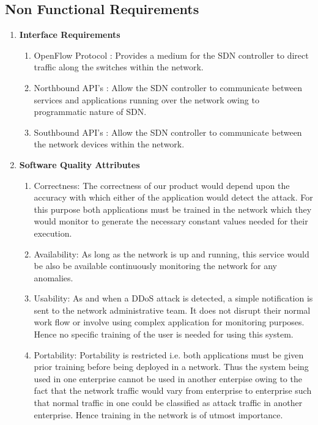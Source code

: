 \documentclass[12pt,a4paper,final]{report}
\begin{document}
\subsection{Non Functional Requirements}
\begin{enumerate}
\item
\textbf{Interface Requirements}
\begin{enumerate}
\item OpenFlow Protocol :
\newline
Provides a medium for the SDN controller to direct traffic along the switches within the network.

\item Northbound API's :
\newline
Allow the SDN controller to communicate between services and applications running over the network owing to programmatic nature of SDN.

\item Southbound API's :
\newline
Allow the SDN controller to communicate between the network devices within the network.
\end{enumerate}

\item
\textbf{Software Quality Attributes}
\begin{enumerate}
\item Correctness:
\newline
The correctness of our product would depend upon the accuracy with which either of the application would detect the attack. For this purpose both applications must be trained in the network which they would monitor to generate the necessary constant values needed for their execution.

\item Availability:
\newline
As long as the network is up and running, this service would be also be available continuously monitoring the network for any anomalies.

\newpage
\item Usability: 
\newline
As and when a DDoS attack is detected, a simple notification is sent to the network administrative team. It does not disrupt their normal work flow or involve using complex application for monitoring purposes. Hence no specific training of the user is needed for using this system. 

\item Portability: 
\newline
Portability is restricted i.e. both applications must be given prior training before being deployed in a network. Thus the system being used in one enterprise cannot be used in another enterpise owing to the fact that the network traffic would vary from enterprise to enterprise such that normal traffic in one could be classified as attack traffic in another enterprise. Hence training in the network is of utmost importance.
\end{enumerate}
\end{enumerate}
\end{document}
